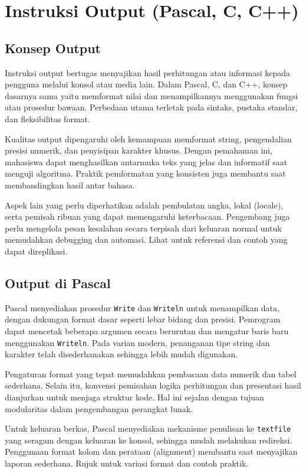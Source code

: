 \documentclass[../main.tex]{subfiles}
\begin{document}
\chapter{Instruksi Output (Pascal, C, C++)}
\section{Konsep Output}
Instruksi output bertugas menyajikan hasil perhitungan atau informasi kepada pengguna melalui konsol atau media lain. Dalam Pascal, C, dan C++, konsep dasarnya sama yaitu memformat nilai dan menampilkannya menggunakan fungsi atau prosedur bawaan. Perbedaan utama terletak pada sintaks, pustaka standar, dan fleksibilitas format.

Kualitas output dipengaruhi oleh kemampuan memformat string, pengendalian presisi numerik, dan penyisipan karakter khusus. Dengan pemahaman ini, mahasiswa dapat menghasilkan antarmuka teks yang jelas dan informatif saat menguji algoritma. Praktik pemformatan yang konsisten juga membantu saat membandingkan hasil antar bahasa.

Aspek lain yang perlu diperhatikan adalah pembulatan angka, lokal (locale), serta pemisah ribuan yang dapat memengaruhi keterbacaan. Pengembang juga perlu mengelola pesan kesalahan secara terpisah dari keluaran normal untuk memudahkan debugging dan automasi. Lihat \textcite{w3pascal-io,k&r-c-output-input,cplusplus-io} untuk referensi dan contoh yang dapat direplikasi.

\section{Output di Pascal}
Pascal menyediakan prosedur \texttt{Write} dan \texttt{Writeln} untuk menampilkan data, dengan dukungan format dasar seperti lebar bidang dan presisi. Pemrogram dapat mencetak beberapa argumen secara berurutan dan mengatur baris baru menggunakan \texttt{Writeln}. Pada varian modern, penanganan tipe string dan karakter telah disederhanakan sehingga lebih mudah digunakan.

Pengaturan format yang tepat memudahkan pembacaan data numerik dan tabel sederhana. Selain itu, konvensi pemisahan logika perhitungan dan presentasi hasil dianjurkan untuk menjaga struktur kode. Hal ini sejalan dengan tujuan modularitas dalam pengembangan perangkat lunak.

Untuk keluaran berkas, Pascal menyediakan mekanisme penulisan ke \texttt{textfile} yang seragam dengan keluaran ke konsol, sehingga mudah melakukan redireksi. Penggunaan format kolom dan perataan (alignment) membantu saat menyajikan laporan sederhana. Rujuk \textcite{w3pascal-io,free-pascal-docs} untuk variasi format dan contoh praktik.
\end{document}
